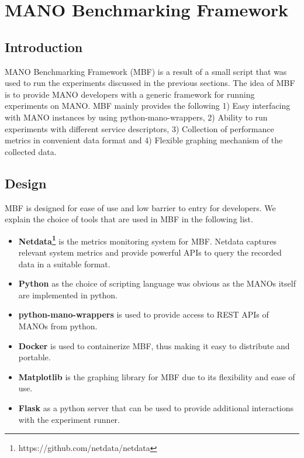 \section{MANO Benchmarking Framework} 

\subsection{Introduction}

MANO Benchmarking Framework (MBF) is a result of a small script that was used to run the experiments discussed in the previous sections. The idea of MBF is to provide MANO developers with a generic framework for running experiments on MANO. MBF mainly provides the following 1) Easy interfacing with MANO instances by using python-mano-wrappers, 2) Ability to run experiments with different service descriptors, 3) Collection of performance metrics in convenient data format and 4) Flexible graphing mechanism of the collected data. 

\subsection{Design}

MBF is designed for ease of use and low barrier to entry for developers. We explain the choice of tools that are used in MBF in the following list.

\begin{itemize}
	\item{\textbf{Netdata\footnote{https://github.com/netdata/netdata}}} is the metrics monitoring system for MBF. Netdata captures relevant system metrics and provide powerful APIs to query the recorded data in a suitable format.
	\item{\textbf{Python}} as the choice of scripting language was obvious as the MANOs itself are implemented in python.
	\item{\textbf{python-mano-wrappers}} is used to provide access to REST APIs of MANOs from python.
	\item{\textbf{Docker}} is used to containerize MBF, thus making it easy to distribute and portable.
	\item{\textbf{Matplotlib}} is the graphing library for MBF due to its flexibility and ease of use.
	\item{\textbf{Flask}} as a python server that can be used to provide additional interactions with the experiment runner.

\end{itemize}


